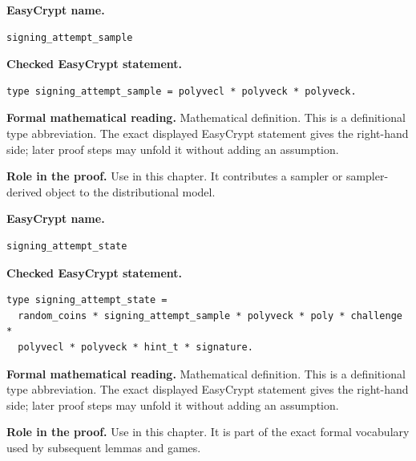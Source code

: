 \begin{formaldefinition}
\noindent\textbf{EasyCrypt name.}
\begin{lstlisting}[language=EasyCrypt,basicstyle=\ttfamily\scriptsize]
signing_attempt_sample
\end{lstlisting}
\noindent\textbf{Checked EasyCrypt statement.}
\begin{lstlisting}[language=EasyCrypt,basicstyle=\ttfamily\scriptsize]
type signing_attempt_sample = polyvecl * polyveck * polyveck.
\end{lstlisting}
\noindent\textbf{Formal mathematical reading.}
Mathematical definition. This is a definitional type abbreviation.  The exact displayed EasyCrypt statement gives the right-hand side; later proof steps may unfold it without adding an assumption.

\noindent\textbf{Role in the proof.}
Use in this chapter. It contributes a sampler or sampler-derived object to the distributional model.

\end{formaldefinition}

\begin{formaldefinition}
\noindent\textbf{EasyCrypt name.}
\begin{lstlisting}[language=EasyCrypt,basicstyle=\ttfamily\scriptsize]
signing_attempt_state
\end{lstlisting}
\noindent\textbf{Checked EasyCrypt statement.}
\begin{lstlisting}[language=EasyCrypt,basicstyle=\ttfamily\scriptsize]
type signing_attempt_state =
  random_coins * signing_attempt_sample * polyveck * poly * challenge *
  polyvecl * polyveck * hint_t * signature.
\end{lstlisting}
\noindent\textbf{Formal mathematical reading.}
Mathematical definition. This is a definitional type abbreviation.  The exact displayed EasyCrypt statement gives the right-hand side; later proof steps may unfold it without adding an assumption.

\noindent\textbf{Role in the proof.}
Use in this chapter. It is part of the exact formal vocabulary used by subsequent lemmas and games.

\end{formaldefinition}

